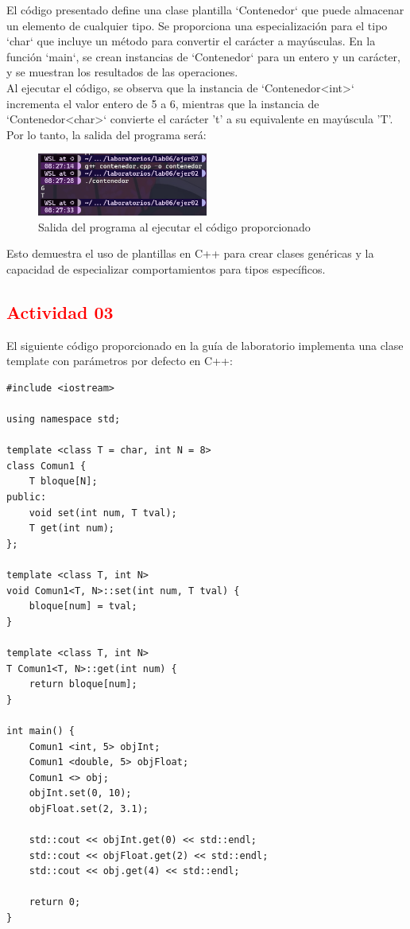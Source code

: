 El código presentado define una clase plantilla `Contenedor` que puede almacenar un elemento de cualquier tipo. Se proporciona una especialización para el tipo `char` que incluye un método para convertir el carácter a mayúsculas. En la función `main`, se crean instancias de `Contenedor` para un entero y un carácter, y se muestran los resultados de las operaciones. \\

Al ejecutar el código, se observa que la instancia de `Contenedor<int>` incrementa el valor entero de 5 a 6, mientras que la instancia de `Contenedor<char>` convierte el carácter 't' a su equivalente en mayúscula 'T'. Por lo tanto, la salida del programa será:

\begin{figure}[H]
    \centering
    \includegraphics[width=0.5\textwidth]{img/Prueba02.png}
    \caption{Salida del programa al ejecutar el código proporcionado}
\end{figure}

Esto demuestra el uso de plantillas en C++ para crear clases genéricas y la capacidad de especializar comportamientos para tipos específicos.




\subsection{\textcolor{red}{Actividad 03}}

El siguiente código proporcionado en la guía de laboratorio implementa una clase template con parámetros por defecto en C++:

\begin{lstlisting}[style=cpp-style, caption={Código en C++ con parámetros por defecto}]
#include <iostream>

using namespace std;

template <class T = char, int N = 8>
class Comun1 {
    T bloque[N];
public:
    void set(int num, T tval);
    T get(int num);
};

template <class T, int N>
void Comun1<T, N>::set(int num, T tval) {
    bloque[num] = tval;
}

template <class T, int N>
T Comun1<T, N>::get(int num) {
    return bloque[num];
}

int main() {
    Comun1 <int, 5> objInt;
    Comun1 <double, 5> objFloat;
    Comun1 <> obj;
    objInt.set(0, 10);
    objFloat.set(2, 3.1);

    std::cout << objInt.get(0) << std::endl;
    std::cout << objFloat.get(2) << std::endl;
    std::cout << obj.get(4) << std::endl;

    return 0;
}
\end{lstlisting}

